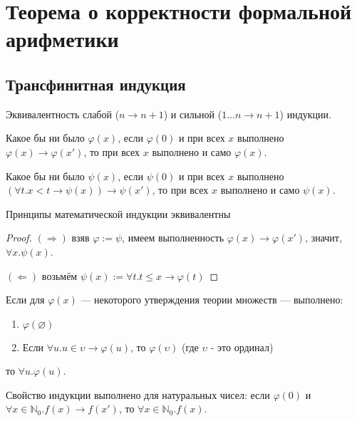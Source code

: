 \section{Теорема о корректности формальной арифметики}


\subsection{Трансфинитная индукция}

Эквивалентность слабой ($n \to n + 1$) и сильной ($1\dots n \to n + 1$) индукции.
\begin{definition}
Какое бы ни было $\varphi(x)$, если $\varphi(0)$ и при всех $x$ выполнено $\varphi(x)\rightarrow \varphi(x')$, то
при всех $x$ выполнено и само $\varphi(x)$.
\end{definition}

\begin{definition}
Какое бы ни было $\psi(x)$, если $\psi(0)$ и при всех $x$ выполнено $(\forall t.x < t \rightarrow \psi(x))\rightarrow \psi(x')$, то
при всех $x$ выполнено и само $\psi(x)$.
\end{definition}

\begin{theorem}
  Принципы математической индукции эквивалентны
\end{theorem}
\begin{proof}
$(\Rightarrow)$ взяв $\varphi := \psi$, имеем выполненность $\varphi(x)\rightarrow\varphi(x')$, значит, $\forall x.\psi(x)$.

$(\Leftarrow)$ возьмём $\psi(x) := \forall t.t\le x\rightarrow\varphi(t)$
\end{proof}

\begin{theorem}
   Если для $\varphi(x)$ --- некоторого утверждения теории множеств --- выполнено:
\begin{enumerate}
\item $\varphi(\varnothing)$
\item Если $\forall u.u \in \upsilon \rightarrow \varphi(u)$, то $\varphi(\upsilon)$ (где $\upsilon$ - это ординал)
\end{enumerate}
то $\forall u.\varphi(u)$.
\end{theorem}

\begin{lemma}Свойство индукции выполнено для натуральных чисел:
если $\varphi(0)$ и $\forall x\in\mathbb{N}_0.f(x) \rightarrow f(x')$, то $\forall x\in\mathbb{N}_0.f(x)$.
\end{lemma}

